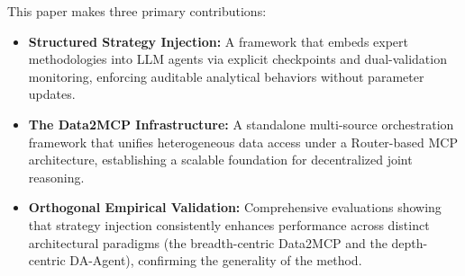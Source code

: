 This paper makes three primary contributions:
\begin{itemize}
    \item \textbf{Structured Strategy Injection:} A framework that embeds expert methodologies into LLM agents via explicit checkpoints and dual-validation monitoring, enforcing auditable analytical behaviors without parameter updates.
    
    \item \textbf{The Data2MCP Infrastructure:} A standalone multi-source orchestration framework that unifies heterogeneous data access under a Router-based MCP architecture, establishing a scalable foundation for decentralized joint reasoning.
    
    \item \textbf{Orthogonal Empirical Validation:} Comprehensive evaluations showing that strategy injection consistently enhances performance across distinct architectural paradigms (the breadth-centric Data2MCP and the depth-centric DA-Agent), confirming the generality of the method.
\end{itemize}